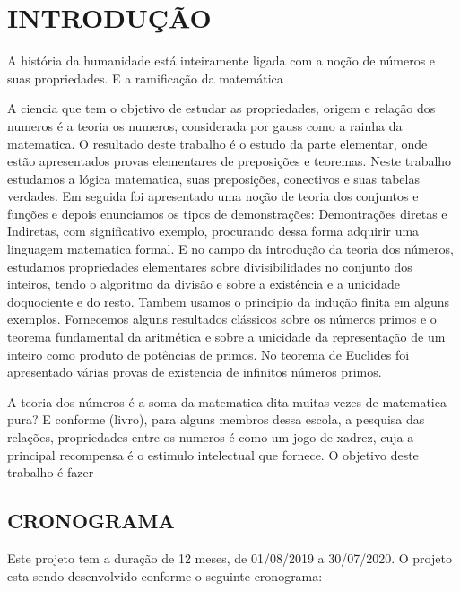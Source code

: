 \chapter{INTRODUÇÃO}
\label{cap:introducao}

A história da humanidade está inteiramente ligada com a noção de números e suas propriedades. E a ramificação da matemática  

A ciencia que tem o objetivo de estudar as propriedades, origem e relação dos numeros é a teoria os numeros, considerada por gauss como a rainha da matematica. O resultado deste trabalho é o estudo da parte elementar, onde estão apresentados provas elementares de preposições e teoremas.
Neste trabalho estudamos a lógica matematica, suas preposições, conectivos e suas tabelas verdades. Em seguida foi apresentado uma noção de teoria dos conjuntos e funções e depois enunciamos os tipos de demonstrações: Demontrações diretas e Indiretas, com significativo exemplo, procurando dessa forma adquirir uma linguagem matematica formal.
E no campo da introdução da teoria dos números, estudamos propriedades elementares sobre divisibilidades no conjunto dos inteiros, tendo o algoritmo da divisão e sobre a existência e a unicidade doquociente e do resto. Tambem usamos o principio da indução finita em alguns exemplos.
Fornecemos alguns resultados clássicos sobre os números primos e o teorema fundamental da aritmética e sobre a unicidade da representação de um inteiro como produto de potências de primos.
No teorema de Euclides foi apresentado várias provas de existencia de infinitos números primos.

A teoria dos números é a soma da matematica dita muitas vezes de matematica pura? E conforme (livro), para alguns membros dessa escola, a pesquisa das relações, propriedades entre os numeros é como um jogo de xadrez, cuja a principal recompensa é o estimulo intelectual que fornece. O objetivo deste trabalho é fazer


  \section{CRONOGRAMA}
  
Este projeto tem a duração de 12 meses, de 01/08/2019 a 30/07/2020. O projeto esta sendo desenvolvido conforme o seguinte cronograma:

